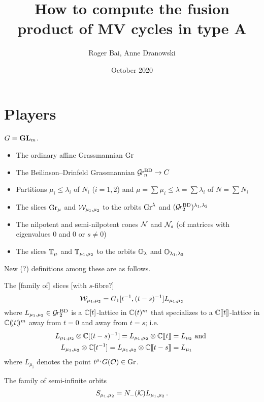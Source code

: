 \documentclass{article}
\title{How to compute the fusion product of MV cycles in type A}
\author{Roger Bai, Anne Dranowski}
\date{October 2020}
\begin{document}
\maketitle

\section{Players}

$G = \GL_m$. 

\begin{itemize}
    \item The ordinary affine Grassmannian $\Gr$
    \item The Beilinson--Drinfeld Grassmannian $\Grbd\to C$
    \item Partitions $\mu_i\le\lambda_i$ of $N_i$ ($i=1,2$) and $\mu = \sum \mu_i \le \lambda = \sum\lambda_i$ of $N = \sum N_i$
    \item The slices $\Gr_\mu$ and $\cW_{\mu_1,\mu_2}$ to the orbits $\Gr^\lambda$ and $(\Grbd[2])^{\lambda_1,\lambda_2}$
    \item The nilpotent and semi-nilpotent cones $\cN$ and $\cN_s$ (of matrices with eigenvalues 0 and 0 or $s\ne 0$)
    \item The slices $\TT_\mu$ and $\TT_{\mu_1,\mu_2}$ to the orbits $\OO_\lambda$ and $\OO_{\lambda_1,\lambda_2}$ 
\end{itemize}

New (?) definitions among these are as follows.
% 

The [family of] slices [with $s$-fibre?]
\begin{equation}
    \cW_{\mu_1,\mu_2} = G_1 [t^{-1},(t-s)^{-1}]L_{\mu_1,\mu_2}
\end{equation}
where $L_{\mu_1,\mu_2}\in\Grbd[2]$ is a $\CC[t]$-lattice in $\CC(t)^m$ that specializes to a $\CC\xt$-lattice in $\CC\xT^m$ away from $t = 0$ and away from $t = s$; i.e.\
\begin{equation}
    \label{eq:defWBD}
    \begin{split}
        L_{\mu_1,\mu_2}\otimes \CC[(t-s)^{-1}] = L_{\mu_1,\mu_2}\otimes \CC\xt &= L_{\mu_2} \text{ and } \\
        L_{\mu_1,\mu_2}\otimes\CC[t^{-1}] = L_{\mu_1,\mu_2}\otimes \CC\xt[t-s] &= L_{\mu_1}
    \end{split}
\end{equation}
where $L_{\mu_i}$ denotes the point $t^{\mu_i}G(\cO)\in\Gr$. 
% 

The family of semi-infinite orbits 
\begin{equation}
    S_{\mu_1,\mu_2} = N_-(\cK) L_{\mu_1,\mu_2}\,. 
\end{equation}
\end{document}
